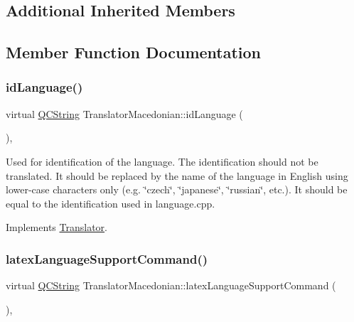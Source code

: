 \subsection*{Additional Inherited Members}


\subsection{Member Function Documentation}
\mbox{\label{class_translator_macedonian_abb15cd7014f193003152208f0a5f9672}} 
\subsubsection{\texorpdfstring{idLanguage()}{idLanguage()}}
{\footnotesize\ttfamily virtual \mbox{\hyperlink{class_q_c_string}{Q\+C\+String}} Translator\+Macedonian\+::id\+Language (\begin{DoxyParamCaption}{ }\end{DoxyParamCaption})\hspace{0.3cm}{\ttfamily [inline]}, {\ttfamily [virtual]}}

Used for identification of the language. The identification should not be translated. It should be replaced by the name of the language in English using lower-\/case characters only (e.\+g. \char`\"{}czech\char`\"{}, \char`\"{}japanese\char`\"{}, \char`\"{}russian\char`\"{}, etc.). It should be equal to the identification used in language.\+cpp. 

Implements \mbox{\hyperlink{class_translator}{Translator}}.

\mbox{\label{class_translator_macedonian_a256abae5c4aa6cb625159ab95fd9d539}} 
\subsubsection{\texorpdfstring{latexLanguageSupportCommand()}{latexLanguageSupportCommand()}}
{\footnotesize\ttfamily virtual \mbox{\hyperlink{class_q_c_string}{Q\+C\+String}} Translator\+Macedonian\+::latex\+Language\+Support\+Command (\begin{DoxyParamCaption}{ }\end{DoxyParamCaption})\hspace{0.3cm}{\ttfamily [inline]}, {\ttfamily [virtual]}}


